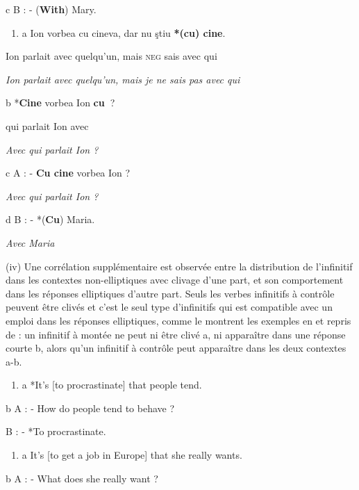   c  B : - (\textbf{With})\textbf{} Mary.  


\begin{enumerate}
\item \label{bkm:Ref305744086}a  Ion  vorbea  cu  cineva,  dar  nu  ştiu  \textbf{*(cu)  cine}.


\end{enumerate}
  Ion  parlait  avec  quelqu'un,  mais  \textsc{neg}  sais  avec  qui 

\textit{  Ion parlait avec quelqu'un, mais je ne sais pas avec qui}  

  b  *\textbf{Cine } vorbea  Ion  \textbf{cu~}?

    qui  parlait  Ion  avec

    \textit{Avec qui parlait Ion ?} 

  c  A : - \textbf{Cu cine} vorbea Ion ?

    \textit{Avec qui parlait Ion ?}

  d  B : - *(\textbf{Cu})\textbf{} Maria.

    \textit{Avec Maria}

(iv) Une corrélation supplémentaire est observée entre la distribution de l'infinitif dans les contextes non-elliptiques avec clivage d'une part, et son comportement dans les réponses elliptiques d'autre part. Seuls les verbes infinitifs à contrôle peuvent être clivés et c'est le seul type d'infinitifs qui est compatible avec un emploi dans les réponses elliptiques, comme le montrent les exemples en  et  repris de \citet{Merchant2009} : un infinitif à montée ne peut ni être clivé a, ni apparaître dans une réponse courte b, alors qu'un infinitif à contrôle peut apparaître dans les deux contextes a-b. 


\begin{enumerate}
\item \label{bkm:Ref305746826}a  *It's [to procrastinate] that people tend.


\end{enumerate}
  b  A : - How do people tend to behave ?

    B : - *To procrastinate.  


\begin{enumerate}
\item \label{bkm:Ref305746829}a  It's [to get a job in Europe] that she really wants. 


\end{enumerate}
  b  A : - What does she really want ?

